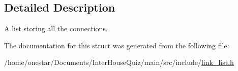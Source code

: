 \subsection{Detailed Description}
A list storing all the connections. 

The documentation for this struct was generated from the following file\+:\begin{DoxyCompactItemize}
\item 
/home/onestar/\+Documents/\+Inter\+House\+Quiz/main/src/include/\hyperlink{link__list_8h}{link\+\_\+list.\+h}\end{DoxyCompactItemize}
